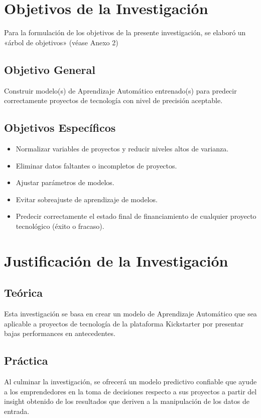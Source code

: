 \section{Objetivos de la Investigación}
Para la formulación de los objetivos de la presente investigación, se elaboró un «árbol de objetivos» (véase Anexo 2) 
\subsection{Objetivo General}
\newcommand{\ObjetivoGeneral}{
Construir modelo(s) de Aprendizaje Automático entrenado(s) para predecir correctamente proyectos de tecnología con nivel de precisión aceptable.
}
\ObjetivoGeneral
\subsection{Objetivos Espec\'{i}ficos}
\newcommand{\Objone}{
Normalizar variables de proyectos y reducir niveles altos de varianza.
}
\newcommand{\Objtwo}{
Eliminar datos faltantes o incompletos de proyectos.
}
\newcommand{\Objthree}{
Ajustar parámetros de modelos.
}
\newcommand{\Objfour}{
Evitar sobreajuste de aprendizaje de modelos.
}
\newcommand{\Objfive}{
Predecir correctamente el estado final de financiamiento de cualquier proyecto tecnológico (éxito o fracaso).
}

\begin{itemize}
	\item {\Objone}
	\item {\Objtwo}
	\item {\Objthree}
	\item {\Objfour}
	\item {\Objfive}
\end{itemize}

\section{Justificación de la Investigación}

\subsection{Teórica}
Esta investigación se basa en crear un modelo de Aprendizaje Automático que sea aplicable a proyectos de tecnología de la plataforma Kickstarter por presentar bajas performances en antecedentes.

\subsection{Práctica}
Al culminar la investigación, se ofrecerá un modelo predictivo confiable que ayude a los emprendedores en la toma de decisiones respecto a sus proyectos a partir del insight obtenido de los resultados que deriven a la manipulación de los datos de entrada.

